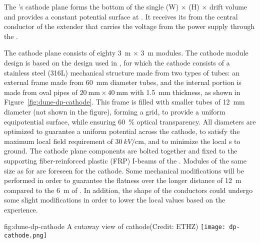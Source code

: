 The \dpmod{}'s cathode plane forms the  bottom of the single 
\dptpcwdth (W) $\times$ \tpcheight (H) $\times$ \dptpclen
drift volume and provides a constant potential surface at \dptargetdriftvoltneg{}.  It receives its  from the central conductor of the extender that carries the voltage from the power supply through the  \fdth.  

The cathode plane consists of eighty \SI{3}{\m} $\times$ \SI{3}{\m} modules. 
The cathode module design is based on the design used in  , for which the cathode consists of a stainless steel (316L) mechanical structure 
made from two types of tubes: 
an external frame made from \SI{60}{\milli\m} diameter tubes, and the internal portion is made from oval pipes of $\SI{20}{\milli\m}\times \SI{40}{\milli\m}$ with \SI{1.5}{mm} thickness, as shown in Figure~\ref{fig:dune-dp-cathode}. 
This frame is filled with smaller tubes of \SI{12}{\milli\m} diameter (not shown in the figure), forming a grid, to provide a uniform equipotential surface, while ensuring \SI{60}{\%} optical transparency. All diameters are optimized to guarantee a uniform potential across the cathode, to satisfy the maximum local field requirement of $\SI{30}{kV/\centi\m}$, and to minimize the local \efield{}s to ground. 
The cathode plane components are bolted together and fixed to the supporting  fiber-reinforced plastic (FRP) I-beams of the . 
%
Modules of the same size as for  are foreseen for the \dpmod{} cathode. Some mechanical modifications will be performed in order to guarantee the flatness over the longer distance of  \SI{12}{\m} compared to the  \SI{6}{\m} of  .  In addition, the shape of the conductors could undergo some slight modifications in order to lower the local \efield values based on the  experience.

\begin{dunefigure}{fig:dune-dp-cathode}
{A cutaway view of  cathode(Credit: ETHZ)}
\texttt{[image: dp-cathode.png]}
\end{dunefigure}

